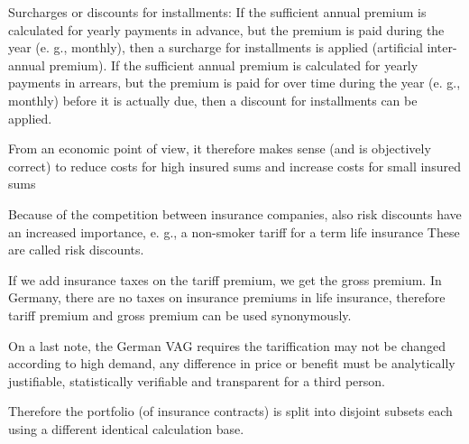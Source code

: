 \documentclass[11pt,a4paper,twoside]{article}
\begin{document}
Surcharges or discounts for installments: If the sufficient annual premium is calculated for
yearly payments in advance, but the premium is paid during the year (e. g., monthly),
then a surcharge for installments is applied (artificial inter-annual premium).
If the sufficient annual premium is calculated for yearly payments in arrears, but the
premium is paid for over time during the year (e. g., monthly) before it is actually due,
then a discount for installments can be applied.

From an economic point of view, it therefore makes sense (and is objectively correct) to
reduce costs for high insured sums and increase costs for small insured sums

Because of the competition between insurance companies, also risk discounts have an
increased importance, e. g., a non-smoker tariff for a term life insurance
These are called risk discounts.

If we add insurance taxes on the tariff premium, we get the gross premium.
In Germany, there are no taxes on insurance premiums in life insurance, therefore tariff
premium and gross premium can be used synonymously.

On a last note, the German VAG requires the tariffication may not be changed according to high demand,
any difference in price or benefit must be analytically justifiable, statistically verifiable and
transparent for a third person.

Therefore the portfolio (of insurance contracts) is split into
disjoint subsets each using a different identical calculation base.
\end{document}
